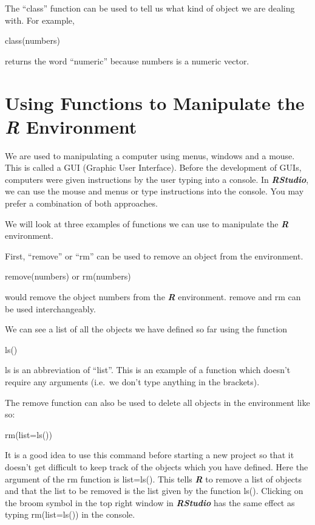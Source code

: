 \documentclass[
]{book}
\begin{document}
The ``class'' function can be used to tell us what kind of object we are dealing with. For example,

class(numbers)

returns the word ``numeric'' because numbers is a numeric vector.

\section{\texorpdfstring{Using Functions to Manipulate the \textbf{\emph{R}} Environment}{Using Functions to Manipulate the R Environment}}\label{using-functions-to-manipulate-the-r-environment}

We are used to manipulating a computer using menus, windows and a mouse. This is called a GUI (Graphic User Interface). Before the development of GUIs, computers were given instructions by the user typing into a console. In \textbf{\emph{RStudio}}, we can use the mouse and menus or type instructions into the console. You may prefer a combination of both approaches.

We will look at three examples of functions we can use to manipulate the \textbf{\emph{R}} environment.

First, ``remove'' or ``rm'' can be used to remove an object from the environment.

remove(numbers)
or
rm(numbers)

would remove the object numbers from the \textbf{\emph{R}} environment. remove and rm can be used interchangeably.

We can see a list of all the objects we have defined so far using the function

ls()

ls is an abbreviation of ``list''. This is an example of a function which doesn't require any arguments (i.e.~we don't type anything in the brackets).

The remove function can also be used to delete all objects in the environment like so:

rm(list=ls())

It is a good idea to use this command before starting a new project so that it doesn't get difficult to keep track of the objects which you have defined. Here the argument of the rm function is list=ls(). This tells \textbf{\emph{R}} to remove a list of objects and that the list to be removed is the list given by the function ls(). Clicking on the broom symbol in the top right window in \textbf{\emph{RStudio}} has the same effect as typing rm(list=ls()) in the console.
\end{document}
